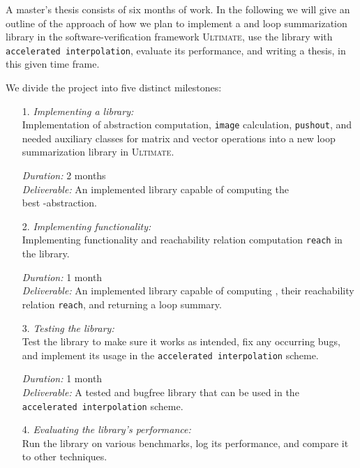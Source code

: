 A master's thesis consists of six months of work. In the following we will give an outline of the approach of how we plan to implement a \qvasr and \qvasrs loop summarization library in the software-verification framework \textsc{Ultimate}, use the library with \texttt{accelerated interpolation}, evaluate its performance, and writing a thesis, in this given time frame. \\ \par
We divide the project into five distinct milestones:

\begin{itemize}
	\item[1.] \textsl{Implementing a \qvasr library:} \\
               Implementation of \qvasr abstraction computation, \qvasr \texttt{image} calculation, \texttt{pushout}, and needed auxiliary classes for matrix and vector operations into a new loop summarization library in \textsc{Ultimate}.

			  \textsl{Duration:} 2 months \\
			  \textsl{Deliverable:} An implemented library capable of computing the \\ best \qvasr-abstraction.

	\item[2.] \textsl{Implementing \qvasrs functionality:} \\
               Implementing \qvasrs functionality and reachability relation computation \texttt{reach} in the \qvasr library.

			  \textsl{Duration:} 1 month \\
			  \textsl{Deliverable:} An implemented library capable of computing \qvasrs, their reachability relation \texttt{reach}, and returning a loop summary.

	\item[3.] \textsl{Testing the library:} \\
               Test the library to make sure it works as intended, fix any occurring bugs, and implement its usage in the \texttt{accelerated interpolation} scheme.

			  \textsl{Duration:} 1 month \\
			  \textsl{Deliverable:} A tested and bugfree \qvasr library that can be used in the \\ \texttt{accelerated interpolation} scheme.

	\item[4.] \textsl{Evaluating the library's performance:} \\
               Run the library on various benchmarks, log its performance, and compare it to other techniques.


\end{itemize}
